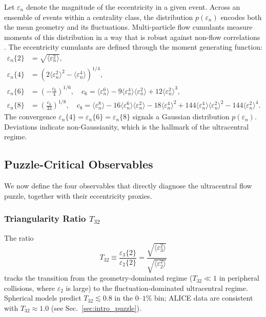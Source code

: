 \documentclass[12pt,a4paper,twoside]{report}
\newcommand{\mean}[1]{\langle #1 \rangle}
\begin{document}
Let $\varepsilon_n$ denote the magnitude of the eccentricity in a given
event.  Across an ensemble of events within a centrality class, the
distribution $p(\varepsilon_n)$ encodes both the mean geometry and its
fluctuations.  Multi-particle flow cumulants measure moments of this
distribution in a way that is robust against non-flow correlations
\cite{Borghini2001}.  The eccentricity cumulants are defined through
the moment generating function:
\begin{align}
  \varepsilon_n\{2\} &= \sqrt{\mean{\varepsilon_n^2}},
    \label{eq:e2_cumulant} \\[4pt]
  \varepsilon_n\{4\} &= \left(2\mean{\varepsilon_n^2}^2 -
    \mean{\varepsilon_n^4}\right)^{1/4},
    \label{eq:e4_cumulant} \\[4pt]
  \varepsilon_n\{6\} &= \left(-\frac{c_6}{4}\right)^{1/6},\quad
    c_6 = \mean{\varepsilon_n^6} - 9\mean{\varepsilon_n^4}\mean{\varepsilon_n^2}
          + 12\mean{\varepsilon_n^2}^3,
    \label{eq:e6_cumulant} \\[4pt]
  \varepsilon_n\{8\} &= \left(\frac{c_8}{33}\right)^{1/8},\quad
    c_8 = \mean{\varepsilon_n^8} - 16\mean{\varepsilon_n^6}\mean{\varepsilon_n^2}
          - 18\mean{\varepsilon_n^4}^2
          + 144\mean{\varepsilon_n^4}\mean{\varepsilon_n^2}^2
          - 144\mean{\varepsilon_n^2}^4.
    \label{eq:e8_cumulant}
\end{align}
The convergence $\varepsilon_n\{4\} = \varepsilon_n\{6\} = \varepsilon_n\{8\}$
signals a Gaussian distribution $p(\varepsilon_n)$.  Deviations indicate
non-Gaussianity, which is the hallmark of the ultracentral regime.

\subsection{Puzzle-Critical Observables}
\label{subsec:puzzle_observables}

We now define the four observables that directly diagnose the
ultracentral flow puzzle, together with their eccentricity proxies.

\subsubsection{Triangularity Ratio \texorpdfstring{$T_{32}$}{T32}}

The ratio
\begin{equation}
  T_{32} \equiv \frac{\varepsilon_3\{2\}}{\varepsilon_2\{2\}}
  = \frac{\sqrt{\mean{\varepsilon_3^2}}}{\sqrt{\mean{\varepsilon_2^2}}}
  \label{eq:T32}
\end{equation}
tracks the transition from the geometry-dominated regime
($T_{32} \ll 1$ in peripheral collisions, where $\varepsilon_2$ is large)
to the fluctuation-dominated ultracentral regime.  Spherical models predict
$T_{32} \lesssim 0.8$ in the $0$--$1\%$ bin; ALICE data are consistent with
$T_{32} \approx 1.0$ (see Sec.~\ref{sec:intro_puzzle}).
\end{document}
